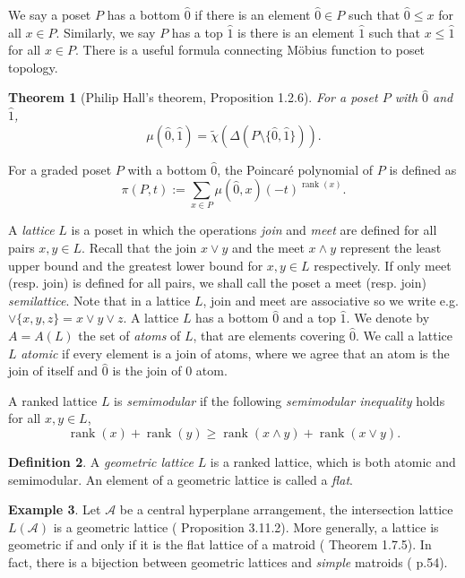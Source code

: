 \documentclass{amsart}
\numberwithin{equation}{section}
\newtheorem{thm}{Theorem}[section]
\theoremstyle{plain}
\theoremstyle{remark}
\theoremstyle{definition}
\newtheorem{defn}[thm]{Definition}
\newtheorem{ex}[thm]{Example}
\numberwithin{equation}{section}
\newcommand{\A}{\mathcal{A}}
\DeclareMathOperator{\rank}{rank}
\begin{document}
We say a poset $P$ has a bottom $\hat0$ if there is an element $\hat0\in P$ such that $\hat0\leq x$ for all $x\in P$. Similarly, we say $P$ has a top $\hat 1$ is there is an element $\hat 1$ such that $x\leq \hat1$ for all $x\in P$. There is a useful formula connecting M\"obius function to poset topology.
\begin{thm}[Philip Hall's theorem, \cite{Wachs2007} Proposition 1.2.6]\label{Hall}
    For a poset $P$ with $\hat{0}$ and $\hat1$,
    \[
    \mu(\hat0,\hat1)=\widetilde{\chi}(\Delta(P\setminus\{\hat0,\hat1\})).
    \]
\end{thm}


For a graded poset $P$ with a bottom $\hat0$, the Poincar\'e polynomial of $P$ is defined as
\[
\pi(P,t):=\sum_{x\in P}\mu(\hat0,x)(-t)^{\rank(x)}.
\]

A {\it lattice} $L$ is a poset in which the operations {\it join} and {\it meet} are defined for all pairs $x,y\in L$. Recall that the join $x\vee y$ and the meet $x\wedge y$ represent the least upper bound and the greatest lower bound for $x,y\in L$ respectively. If only meet (resp. join) is defined for all pairs, we shall call the poset a meet (resp. join) {\it semilattice}.
Note that in a lattice $L$, join and meet are associative so we write e.g. $\vee\{x,y,z\}=x\vee y\vee z$. A lattice $L$ has a bottom $\hat{0}$ and a top $\hat{1}$. 
We denote by $A=A(L)$ the set of {\it atoms} of $L$, that are elements covering $\hat{0}$. We call a lattice $L$ {\it atomic} if every element is a join of atoms, where we agree that an atom is the join of itself and $\hat{0}$ is the join of $0$ atom.

A ranked lattice $L$ is {\it semimodular} if the following {\it semimodular inequality} holds for all $x,y\in L$,
\[
\rank(x)+\rank(y)\geq \rank(x\wedge y)+\rank(x\vee y).
\]

\begin{defn}
    A {\it geometric lattice} $L$ is a ranked lattice, which is both atomic and semimodular. An element of a geometric lattice is called a \emph{flat}.
\end{defn}

\begin{ex}
    Let $\A$ be a central hyperplane arrangement, the intersection lattice $L(\A)$ is a geometric lattice (\cite{Stanley2012} Proposition 3.11.2). More generally, a lattice is geometric if and only if it is the flat lattice of a matroid (\cite{Oxley2011} Theorem 1.7.5). In fact, there is a bijection between geometric lattices and {\it simple} matroids (\cite{Oxley2011} p.54).
\end{ex}
\end{document}
